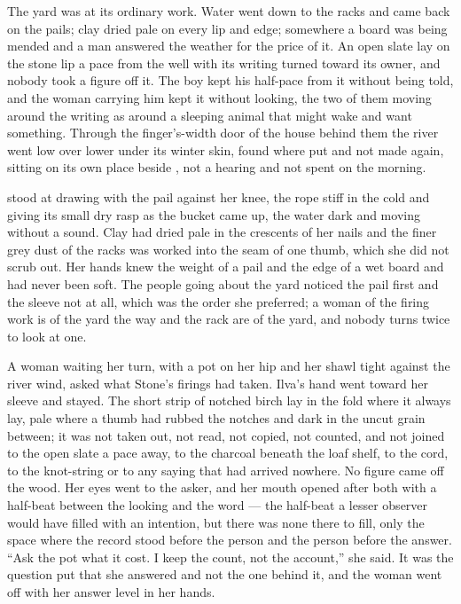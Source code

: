 The yard was at its ordinary work. Water went down to the racks and came back on the pails; clay dried pale on every lip and edge; somewhere a board was being mended and a man answered the weather for the price of it. An open slate lay on the stone lip a pace from the well with its writing turned toward its owner, and nobody took a figure off it. The boy kept his half-pace from it without being told, and the woman carrying him kept it without looking, the two of them moving around the writing as around a sleeping animal that might wake and want something. Through the finger's-width door of the house behind them the river went low over lower under its winter skin, found where put and not made again, sitting on its own place beside , not a hearing and not spent on the morning.

\scenebreak

 stood at  drawing with the pail against her knee, the rope stiff in the  cold and giving its small dry rasp as the bucket came up, the water dark and moving without a sound. Clay had dried pale in the crescents of her nails and the finer grey dust of the racks was worked into the seam of one thumb, which she did not scrub out. Her hands knew the weight of a pail and the edge of a wet board and had never been soft. The people going about the yard noticed the pail first and the sleeve not at all, which was the order she preferred; a woman of the firing work is of the yard the way  and the rack are of the yard, and nobody turns twice to look at one.

A woman waiting her turn, with a pot on her hip and her shawl tight against the river wind, asked what Stone's firings had taken. Ilva's hand went toward her sleeve and stayed. The short strip of notched birch lay in the fold where it always lay, pale where a thumb had rubbed the notches and dark in the uncut grain between; it was not taken out, not read, not copied, not counted, and not joined to the open slate a pace away, to the charcoal beneath the loaf shelf, to the cord, to the knot-string or to any saying that had arrived nowhere. No figure came off the wood. Her eyes went to the asker, and her mouth opened after both with a half-beat between the looking and the word --- the half-beat a lesser observer would have filled with an intention, but there was none there to fill, only the space where the record stood before the person and the person before the answer. “Ask the pot what it cost. I keep the count, not the account,” she said. It was the question put that she answered and not the one behind it, and the woman went off with her answer level in her hands.

